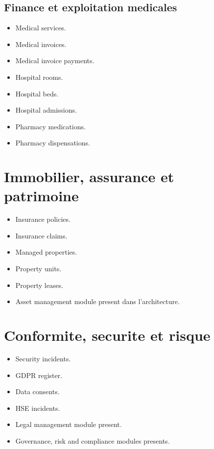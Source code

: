 \documentclass[11pt,a4paper]{article}
\begin{document}
\subsection{Finance et exploitation medicales}
\begin{itemize}[leftmargin=1.2cm]
    \item Medical services.
    \item Medical invoices.
    \item Medical invoice payments.
    \item Hospital rooms.
    \item Hospital beds.
    \item Hospital admissions.
    \item Pharmacy medications.
    \item Pharmacy dispensations.
\end{itemize}

\section{Immobilier, assurance et patrimoine}
\begin{itemize}[leftmargin=1.2cm]
    \item Insurance policies.
    \item Insurance claims.
    \item Managed properties.
    \item Property units.
    \item Property leases.
    \item Asset management module present dans l'architecture.
\end{itemize}

\section{Conformite, securite et risque}
\begin{itemize}[leftmargin=1.2cm]
    \item Security incidents.
    \item GDPR register.
    \item Data consents.
    \item HSE incidents.
    \item Legal management module present.
    \item Governance, risk and compliance modules presents.
\end{itemize}
\end{document}
